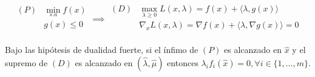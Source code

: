 \begin{equation}
	\begin{aligned}
		(P) & \min_{s.a} f(x)\\
		& g(x) \leq 0\\
	\end{aligned} \implies
	\begin{aligned}
		(D) & \max_{\lambda\geq 0} L(x,\lambda)= f(x) + \langle\lambda,g(x)\rangle\\
		& \nabla_x L(x,\lambda) = \nabla f(x) + \langle\lambda,\nabla g(x)\rangle = 0\\
	\end{aligned}
\end{equation}


\begin{theorem}
	Bajo las hipótesis de dualidad fuerte, si el ínfimo de $(P)$ es alcanzado en $\hat{x}$ y el supremo de $(D)$ es alcanzado en $(\hat{\lambda},\hat{\mu})$ entonces $\lambda_i f_i(\hat{x})=0, \forall i\in\{1,\ldots,m\}$.
\end{theorem}
